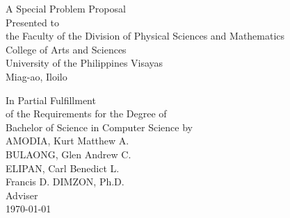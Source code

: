 \begin{titlepage}
\centering


\vspace{1.75cm}
A Special Problem Proposal\\
Presented to\\
the Faculty of the Division of Physical Sciences and Mathematics\\
College of Arts and Sciences\\
University of the Philippines Visayas\\
Miag-ao, Iloilo

\vspace{1.75cm}
In Partial Fulfillment\\
of the Requirements for the Degree of\\
Bachelor of Science in Computer Science
\vspace{1.75cm}
by\\

\vspace{1cm}
AMODIA, Kurt Matthew A.  \\
BULAONG, Glen Andrew C. \\
ELIPAN, Carl Benedict L.   \\

\vspace{1.75cm}
Francis D. DIMZON, Ph.D.\\
Adviser\\

\vspace{1.75cm}
\today
\end{titlepage}
